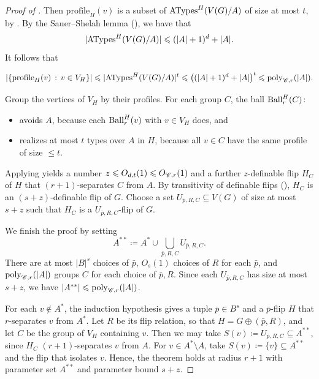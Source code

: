 \begin{proof}[Proof of ]
Then $\mathrm{profile}_H(v)$ 
is a subset of $\mathrm{ATypes}^H(V(G)/ A)$ of size at most $t$, 
by .
By the Sauer--Shelah lemma (), we have that
\[
    |\mathrm{ATypes}^H(V(G)/ A)|\leqslant (|A|+1)^d+|A|.
\]
It follows that 

    \[
        |\{\mathrm{profile}_H(v) \,:\, v \in V_H\}|
        \leqslant
        |\mathrm{ATypes}^H(V(G)/ A)|^t \leqslant \big((|A|+1)^d+|A|\big)^t 
        \leqslant 
        \mathrm{poly}_{\mathscr C,r}(|A|).
    \]
    
    Group the vertices of $V_H$ by their profiles.
    For each group $C$, the ball $\operatorname{Ball}_r^H(C)$:
    \begin{itemize}
        \item avoids $A$, because each $\operatorname{Ball}_r^H(v)$ with $v \in V_H$ does, and
        \item realizes at most $t$ types over $A$ in $H$, because all $v \in C$ have the same profile of size ${\leq}t$.    
    \end{itemize}
    Applying  yields a 
    number $z\leqslant O_{d,t}(1)\leqslant O_{\mathscr C,r}(1)$ and a
    further $z$-definable flip $H_C$ of $H$ that $(r+1)$-separates $C$ from $A$.
    By transitivity of definable flips (), $H_C$ is an $(s+z)$-definable flip of $G$.
    Choose a set $U_{\bar p,R,C}\subseteq V(G)$ of size at most $s+z$ such that $H_C$ is a $U_{\bar p,R,C}$-flip of $G$.

    We finish the proof by setting
    \[
        A^{**}\coloneqq A^*\cup\bigcup_{\bar p,R,C}U_{\bar p,R,C}.
    \]
    There are at most $|B|^s$ choices of $\bar p$, $O_s(1)$ choices of $R$ for each $\bar p$, and $\mathrm{poly}_{\mathscr C,r}(|A|)$ groups $C$ for each choice of $\bar p,R$.
    Since each $U_{\bar p,R,C}$ has size at most $s+z$, we have $|A^{**}|\leqslant\mathrm{poly}_{\mathscr C,r}(|A|)$.

    For each $v\notin A^*$, the induction hypothesis gives a tuple $\bar p \in B^s$ and a $\bar p$-flip $H$ that $r$-separates $v$ from $A^*$.
    Let $R$ be its flip relation, so that $H=G\oplus (\bar p,R)$, and let $C$ be the group of $V_H$ containing $v$.
    Then we may take $S(v)\coloneqq U_{\bar p,R,C}\subseteq A^{**}$, since $H_C$ $(r+1)$-separates $v$ from $A$.
    For $v\in A^*\setminus A$, take $S(v)\coloneqq \{v\}\subseteq A^{**}$ and the flip that isolates $v$.
    Hence, the theorem holds at radius $r+1$ with parameter set $A^{**}$ and parameter bound $s+z$.
\end{proof}










